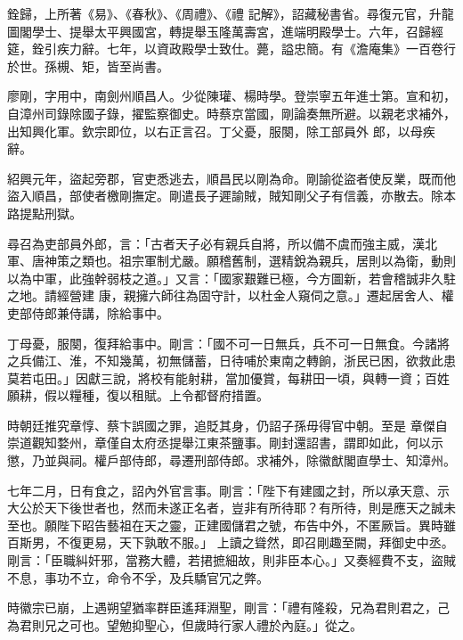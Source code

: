 \begin{pinyinscope}
 銓歸，上所著《易》、《春秋》、《周禮》、《禮
 記解》，詔藏秘書省。尋復元官，升龍圖閣學士、提舉太平興國宮，轉提舉玉隆萬壽宮，進端明殿學士。六年，召歸經筵，銓引疾力辭。七年，以資政殿學士致仕。薨，謚忠簡。有《澹庵集》一百卷行於世。孫槻、矩，皆至尚書。



 廖剛，字用中，南劍州順昌人。少從陳瓘、楊時學。登崇寧五年進士第。宣和初，自漳州司錄除國子錄，擢監察御史。時蔡京當國，剛論奏無所避。以親老求補外，出知興化軍。欽宗即位，以右正言召。丁父憂，服闋，除工部員外
 郎，以母疾辭。



 紹興元年，盜起旁郡，官吏悉逃去，順昌民以剛為命。剛諭從盜者使反業，既而他盜入順昌，部使者檄剛撫定。剛遣長子遲諭賊，賊知剛父子有信義，亦散去。除本路提點刑獄。



 尋召為吏部員外郎，言：「古者天子必有親兵自將，所以備不虞而強主威，漢北軍、唐神策之類也。祖宗軍制尤嚴。願稽舊制，選精銳為親兵，居則以為衛，動則以為中軍，此強幹弱枝之道。」又言：「國家艱難已極，今方圖新，若會稽誠非久駐之地。請經營建
 康，親擁六師往為固守計，以杜金人窺伺之意。」遷起居舍人、權吏部侍郎兼侍講，除給事中。



 丁母憂，服闋，復拜給事中。剛言：「國不可一日無兵，兵不可一日無食。今諸將之兵備江、淮，不知幾萬，初無儲蓄，日待哺於東南之轉餉，浙民已困，欲救此患莫若屯田。」因獻三說，將校有能射耕，當加優賞，每耕田一頃，與轉一資；百姓願耕，假以糧種，復以租賦。上令都督府措置。



 時朝廷推究章惇、蔡卞誤國之罪，追貶其身，仍詔子孫毋得官中朝。至是
 章傑自崇道觀知婺州，章僅自太府丞提舉江東茶鹽事。剛封還詔書，謂即如此，何以示懲，乃並與祠。權戶部侍郎，尋遷刑部侍郎。求補外，除徽猷閣直學士、知漳州。



 七年二月，日有食之，詔內外官言事。剛言：「陛下有建國之封，所以承天意、示大公於天下後世者也，然而未遂正名者，豈非有所待耶？有所待，則是應天之誠未至也。願陛下昭告藝祖在天之靈，正建國儲君之號，布告中外，不匿厥旨。異時雖百斯男，不復更易，天下孰敢不服。」
 上讀之聳然，即召剛趣至闕，拜御史中丞。剛言：「臣職糾奸邪，當務大體，若捃摭細故，則非臣本心。」又奏經費不支，盜賊不息，事功不立，命令不孚，及兵驕官冗之弊。



 時徽宗已崩，上遇朔望猶率群臣遙拜淵聖，剛言：「禮有隆殺，兄為君則君之，己為君則兄之可也。望勉抑聖心，但歲時行家人禮於內庭。」從之。




\end{pinyinscope}
